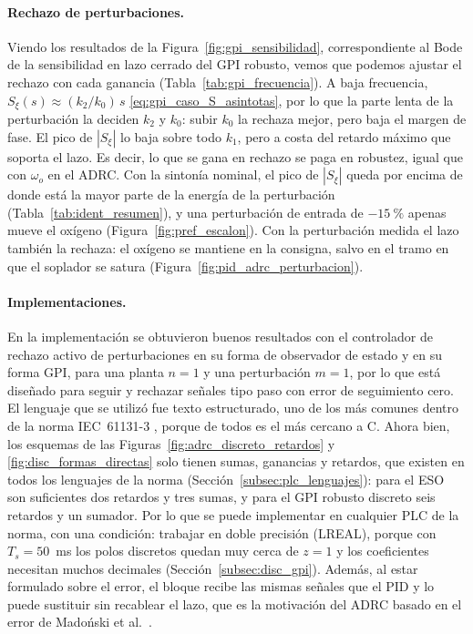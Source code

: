\paragraph{Rechazo de perturbaciones.} Viendo los resultados de la Figura~\ref{fig:gpi_sensibilidad},
correspondiente al Bode de la sensibilidad en lazo cerrado del GPI robusto, vemos que podemos ajustar el
rechazo con cada ganancia (Tabla~\ref{tab:gpi_frecuencia}). A baja frecuencia,
$S_{\xi}(s) \approx (k_2/k_0)\,s$ \eqref{eq:gpi_caso_S_asintotas}, por lo que la parte lenta de la
perturbación la deciden $k_2$ y $k_0$: subir $k_0$ la rechaza mejor, pero baja el margen de fase. El
pico de $|S_{\xi}|$ lo baja sobre todo $k_1$, pero a costa del retardo máximo que soporta el lazo. Es
decir, lo que se gana en rechazo se paga en robustez, igual que con $\omega_o$ en el ADRC. Con la
sintonía nominal, el pico de $|S_{\xi}|$ queda por encima de donde está la mayor parte de la energía de
la perturbación (Tabla~\ref{tab:ident_resumen}), y una perturbación de entrada de $-15~\%$ apenas mueve
el oxígeno (Figura~\ref{fig:pref_escalon}). Con la perturbación medida el lazo también la rechaza:
el oxígeno se mantiene en la consigna, salvo en el tramo en que el soplador se satura
(Figura~\ref{fig:pid_adrc_perturbacion}).

\paragraph{Implementaciones.} En la implementación se obtuvieron buenos resultados con el controlador
de rechazo activo de perturbaciones en su forma de observador de estado y en su forma GPI, para una
planta $n = 1$ y una perturbación $m = 1$, por lo que está diseñado para seguir y rechazar señales tipo
paso con error de seguimiento cero. El lenguaje que se utilizó fue texto estructurado, uno de los más
comunes dentro de la norma IEC~61131-3 \cite{iec61131}, porque de todos es el más cercano a C. Ahora
bien, los esquemas de las Figuras~\ref{fig:adrc_discreto_retardos} y \ref{fig:disc_formas_directas}
solo tienen sumas, ganancias y retardos, que existen en todos los lenguajes de la norma
(Sección~\ref{subsec:plc_lenguajes}): para el ESO son suficientes dos retardos y tres sumas, y para el
GPI robusto discreto seis retardos y un sumador. Por lo que se puede implementar en cualquier PLC de la norma,
con una condición: trabajar en doble precisión (LREAL), porque con $T_s = 50$~ms los polos discretos
quedan muy cerca de $z = 1$ y los coeficientes necesitan muchos decimales
(Sección~\ref{subsec:disc_gpi}). Además, al estar formulado sobre el error, el bloque recibe las mismas
señales que el PID y lo puede sustituir sin recablear el lazo, que es la motivación del ADRC basado en
el error de Madoński et al.\ \cite{madonski2019general}.

